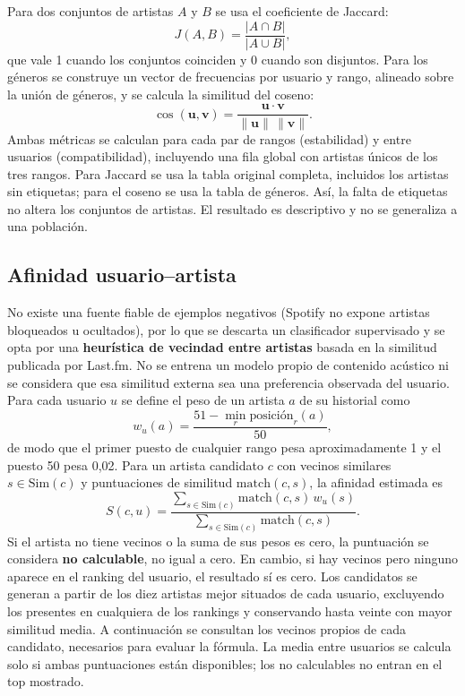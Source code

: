 Para dos conjuntos de artistas $A$ y $B$ se usa el coeficiente de Jaccard:
\[
J(A,B) = \frac{|A \cap B|}{|A \cup B|},
\]
que vale 1 cuando los conjuntos coinciden y 0 cuando son disjuntos. Para los géneros se construye un vector de frecuencias por usuario y rango, alineado sobre la unión de géneros, y se calcula la similitud del coseno:
\[
\cos(\mathbf{u},\mathbf{v}) = \frac{\mathbf{u}\cdot\mathbf{v}}{\|\mathbf{u}\|\,\|\mathbf{v}\|}.
\]
Ambas métricas se calculan para cada par de rangos (estabilidad) y entre usuarios (compatibilidad), incluyendo una fila global con artistas únicos de los tres rangos. Para Jaccard se usa la tabla original completa, incluidos los artistas sin etiquetas; para el coseno se usa la tabla de géneros. Así, la falta de etiquetas no altera los conjuntos de artistas. El resultado es descriptivo y no se generaliza a una población.

\subsection{Afinidad usuario--artista}
\label{sec:recomendacion}

No existe una fuente fiable de ejemplos negativos (Spotify no expone artistas bloqueados u ocultados), por lo que se descarta un clasificador supervisado y se opta por una \textbf{heurística de vecindad entre artistas} basada en la similitud publicada por Last.fm. No se entrena un modelo propio de contenido acústico ni se considera que esa similitud externa sea una preferencia observada del usuario. Para cada usuario $u$ se define el peso de un artista $a$ de su historial como
\[
w_u(a) = \frac{51 - \min_r \text{posición}_r(a)}{50},
\]
de modo que el primer puesto de cualquier rango pesa aproximadamente 1 y el puesto 50 pesa 0,02. Para un artista candidato $c$ con vecinos similares $s \in \mathrm{Sim}(c)$ y puntuaciones de similitud $\mathrm{match}(c,s)$, la afinidad estimada es
\[
S(c,u) = \frac{\sum_{s \in \mathrm{Sim}(c)} \mathrm{match}(c,s)\, w_u(s)}{\sum_{s \in \mathrm{Sim}(c)} \mathrm{match}(c,s)}.
\]
Si el artista no tiene vecinos o la suma de sus pesos es cero, la puntuación se considera \textbf{no calculable}, no igual a cero. En cambio, si hay vecinos pero ninguno aparece en el ranking del usuario, el resultado sí es cero. Los candidatos se generan a partir de los diez artistas mejor situados de cada usuario, excluyendo los presentes en cualquiera de los rankings y conservando hasta veinte con mayor similitud media. A continuación se consultan los vecinos propios de cada candidato, necesarios para evaluar la fórmula. La media entre usuarios se calcula solo si ambas puntuaciones están disponibles; los no calculables no entran en el top mostrado.

